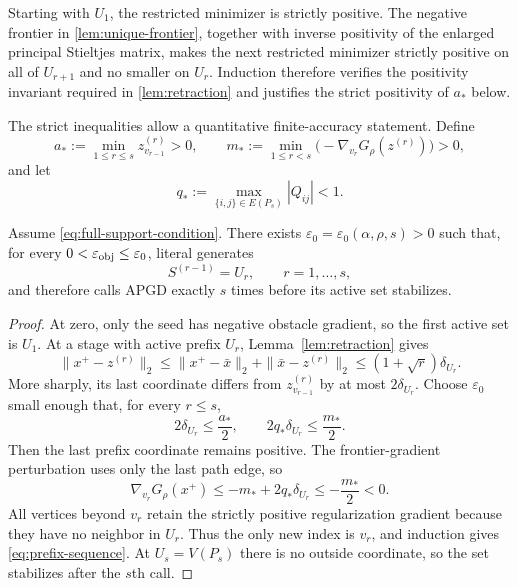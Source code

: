 \documentclass[11pt]{article}
\begin{document}
Starting with $U_1$, the restricted minimizer is strictly positive.  The
negative frontier in \cref{lem:unique-frontier}, together with inverse
positivity of the enlarged principal Stieltjes matrix, makes the next
restricted minimizer strictly positive on all of $U_{r+1}$ and no smaller on
$U_r$.  Induction therefore verifies the positivity invariant required in
\cref{lem:retraction} and justifies the strict positivity of $a_*$ below.

The strict inequalities allow a quantitative finite-accuracy statement.
Define
\begin{equation}
 a_*:=\min_{1\leq r\leq s}z_{v_{r-1}}^{(r)}>0,
 \qquad
 m_*:=\min_{1\leq r<s}
       \bigl(-\nabla_{v_r}G_\rho(z^{(r)})\bigr)>0,
 \label{eq:path-margins}
\end{equation}
and let
\begin{equation}
 q_*:=\max_{\{i,j\}\in E(P_s)}|Q_{ij}|<1.
 \label{eq:path-coupling}
\end{equation}

\begin{theorem}
\label{thm:s-calls}
Assume \cref{eq:full-support-condition}.  There exists
$\varepsilon_0=\varepsilon_0(\alpha,\rho,s)>0$ such that, for every
$0<\varepsilon_{\rm obj}\leq\varepsilon_0$, literal \ASPR{} generates
\begin{equation}
 S^{(r-1)}=U_r,
 \qquad r=1,\ldots,s,
 \label{eq:prefix-sequence}
\end{equation}
and therefore calls APGD exactly $s$ times before its active set stabilizes.
\end{theorem}

\begin{proof}
At zero, only the seed has negative obstacle gradient, so the first active set
is $U_1$.  At a stage with active prefix $U_r$, Lemma~\ref{lem:retraction}
gives
\begin{equation}
 \|x^+-z^{(r)}\|_2
 \leq\|x^+-\bar x\|_2+\|\bar x-z^{(r)}\|_2
 \leq(1+\sqrt r)\delta_{U_r}.
 \label{eq:path-retraction-distance}
\end{equation}
More sharply, its last coordinate differs from $z_{v_{r-1}}^{(r)}$ by at
most $2\delta_{U_r}$.  Choose $\varepsilon_0$ small enough that, for every
$r\leq s$,
\begin{equation}
 2\delta_{U_r}\leq\frac{a_*}{2},
 \qquad
 2q_*\delta_{U_r}\leq\frac{m_*}{2}.
 \label{eq:epsilon-small-enough}
\end{equation}
Then the last prefix coordinate remains positive.  The frontier-gradient
perturbation uses only the last path edge, so
\[
 \nabla_{v_r}G_\rho(x^+)
 \leq -m_*+2q_*\delta_{U_r}
 \leq-\frac{m_*}{2}<0.
\]
All vertices beyond $v_r$ retain the strictly positive regularization
gradient because they have no neighbor in $U_r$.  Thus the only new index is
$v_r$, and induction gives \cref{eq:prefix-sequence}.  At $U_s=V(P_s)$ there
is no outside coordinate, so the set stabilizes after the $s$th call.
\end{proof}
\end{document}
